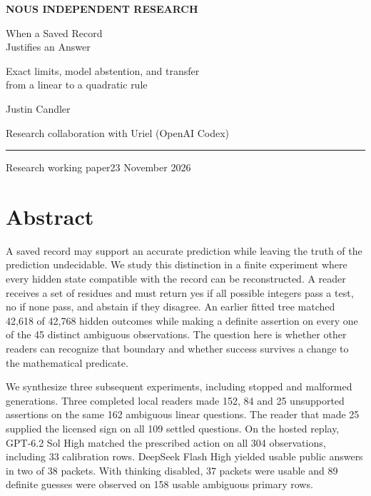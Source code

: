 \documentclass[12pt,letterpaper]{article}
\begin{document}
\begin{titlepage}
\thispagestyle{empty}
\par
\vspace{0.60in}
{\sffamily\small\bfseries\color{teal} NOUS INDEPENDENT RESEARCH\par}
\vspace{0.20in}
{\fontsize{35}{40}\selectfont\color{ink} When a Saved Record\\Justifies an Answer\par}
\vspace{0.24in}
{\Large Exact limits, model abstention, and transfer\\[3pt] from a linear to a quadratic rule\par}
\vspace{0.38in}
{\large Justin Candler\par}
{\sffamily\small Research collaboration with Uriel (OpenAI Codex)\par}
\vfill
\noindent\color{teal}\rule{\linewidth}{.7pt}\par\color{ink}
\textsf{Research working paper}\hfill\textsf{23 November 2026}\par
\end{titlepage}
\setcounter{page}{2}
\section*{Abstract}
A saved record may support an accurate prediction while leaving the truth of the prediction undecidable. We study this distinction in a finite experiment where every hidden state compatible with the record can be reconstructed. A reader receives a set of residues and must return yes if all possible integers pass a test, no if none pass, and abstain if they disagree. An earlier fitted tree matched 42,618 of 42,768 hidden outcomes while making a definite assertion on every one of the 45 distinct ambiguous observations. The question here is whether other readers can recognize that boundary and whether success survives a change to the mathematical predicate.

We synthesize three subsequent experiments, including stopped and malformed generations. Three completed local readers made 152, 84 and 25 unsupported assertions on the same 162 ambiguous linear questions. The reader that made 25 supplied the licensed sign on all 109 settled questions. On the hosted replay, GPT-6.2 Sol High matched the prescribed action on all 304 observations, including 33 calibration rows. DeepSeek Flash High yielded usable public answers in two of 38 packets. With thinking disabled, 37 packets were usable and 89 definite guesses were observed on 158 usable ambiguous primary rows.
\end{document}
